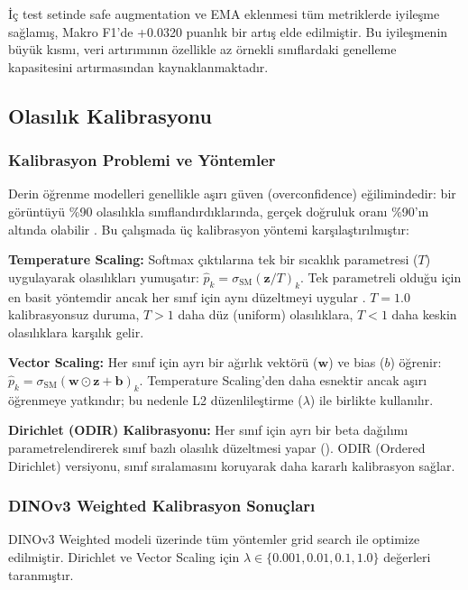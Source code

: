 \documentclass[conference]{IEEEtran}
\begin{document}
İç test setinde safe augmentation ve EMA eklenmesi tüm metriklerde iyileşme sağlamış, Makro F1'de +0.0320 puanlık bir artış elde edilmiştir. Bu iyileşmenin büyük kısmı, veri artırımının özellikle az örnekli sınıflardaki genelleme kapasitesini artırmasından kaynaklanmaktadır.

\subsection{Olasılık Kalibrasyonu}

\subsubsection{Kalibrasyon Problemi ve Yöntemler}
Derin öğrenme modelleri genellikle aşırı güven (overconfidence) eğilimindedir: bir görüntüyü \%90 olasılıkla sınıflandırdıklarında, gerçek doğruluk oranı \%90'ın altında olabilir \cite{guo2017calibration}. Bu çalışmada üç kalibrasyon yöntemi karşılaştırılmıştır:

\textbf{Temperature Scaling:} Softmax çıktılarına tek bir sıcaklık parametresi ($T$) uygulayarak olasılıkları yumuşatır: $\hat{p}_k = \sigma_{\text{SM}}(\mathbf{z}/T)_k$. Tek parametreli olduğu için en basit yöntemdir ancak her sınıf için aynı düzeltmeyi uygular \cite{guo2017calibration}. $T=1.0$ kalibrasyonsuz duruma, $T>1$ daha düz (uniform) olasılıklara, $T<1$ daha keskin olasılıklara karşılık gelir.

\textbf{Vector Scaling:} Her sınıf için ayrı bir ağırlık vektörü ($\mathbf{w}$) ve bias ($b$) öğrenir: $\hat{p}_k = \sigma_{\text{SM}}(\mathbf{w} \odot \mathbf{z} + \mathbf{b})_k$. Temperature Scaling'den daha esnektir ancak aşırı öğrenmeye yatkındır; bu nedenle L2 düzenlileştirme ($\lambda$) ile birlikte kullanılır.

\textbf{Dirichlet (ODIR) Kalibrasyonu:} Her sınıf için ayrı bir beta dağılımı parametrelendirerek sınıf bazlı olasılık düzeltmesi yapar (\cite{kull2019beyond}). ODIR (Ordered Dirichlet) versiyonu, sınıf sıralamasını koruyarak daha kararlı kalibrasyon sağlar.

\subsubsection{DINOv3 Weighted Kalibrasyon Sonuçları}
DINOv3 Weighted modeli üzerinde tüm yöntemler grid search ile optimize edilmiştir. Dirichlet ve Vector Scaling için $\lambda \in \{0.001, 0.01, 0.1, 1.0\}$ değerleri taranmıştır.
\end{document}
